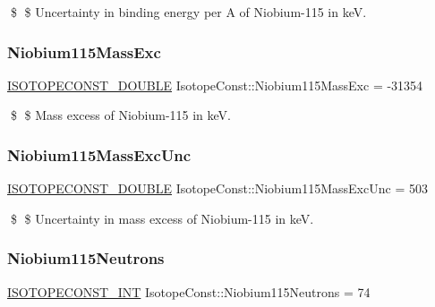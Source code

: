 \$ \$ Uncertainty in binding energy per A of Niobium-\/115 in keV. \mbox{\label{group___isotope_const-_niobium-_nb115_gabadaa412bdfea4cf1e7e2931fb70d4b8}} 
\subsubsection{\texorpdfstring{Niobium115\+Mass\+Exc}{Niobium115MassExc}}
{\footnotesize\ttfamily \mbox{\hyperlink{group___isotope_const-_macros_ga8f45a7272ce02c0b4c65c44636ed719a}{I\+S\+O\+T\+O\+P\+E\+C\+O\+N\+S\+T\+\_\+\+D\+O\+U\+B\+LE}} Isotope\+Const\+::\+Niobium115\+Mass\+Exc = -\/31354}

\$ \$ Mass excess of Niobium-\/115 in keV. \mbox{\label{group___isotope_const-_niobium-_nb115_gaeb6a13a17a21f16e0867930c5ce12689}} 
\subsubsection{\texorpdfstring{Niobium115\+Mass\+Exc\+Unc}{Niobium115MassExcUnc}}
{\footnotesize\ttfamily \mbox{\hyperlink{group___isotope_const-_macros_ga8f45a7272ce02c0b4c65c44636ed719a}{I\+S\+O\+T\+O\+P\+E\+C\+O\+N\+S\+T\+\_\+\+D\+O\+U\+B\+LE}} Isotope\+Const\+::\+Niobium115\+Mass\+Exc\+Unc = 503}

\$ \$ Uncertainty in mass excess of Niobium-\/115 in keV. \mbox{\label{group___isotope_const-_niobium-_nb115_gabe81cda551d3aba1bb57f3355ea5bc44}} 
\subsubsection{\texorpdfstring{Niobium115\+Neutrons}{Niobium115Neutrons}}
{\footnotesize\ttfamily \mbox{\hyperlink{group___isotope_const-_macros_ga5f18360b3e99483a35c32d789e62621c}{I\+S\+O\+T\+O\+P\+E\+C\+O\+N\+S\+T\+\_\+\+I\+NT}} Isotope\+Const\+::\+Niobium115\+Neutrons = 74}

